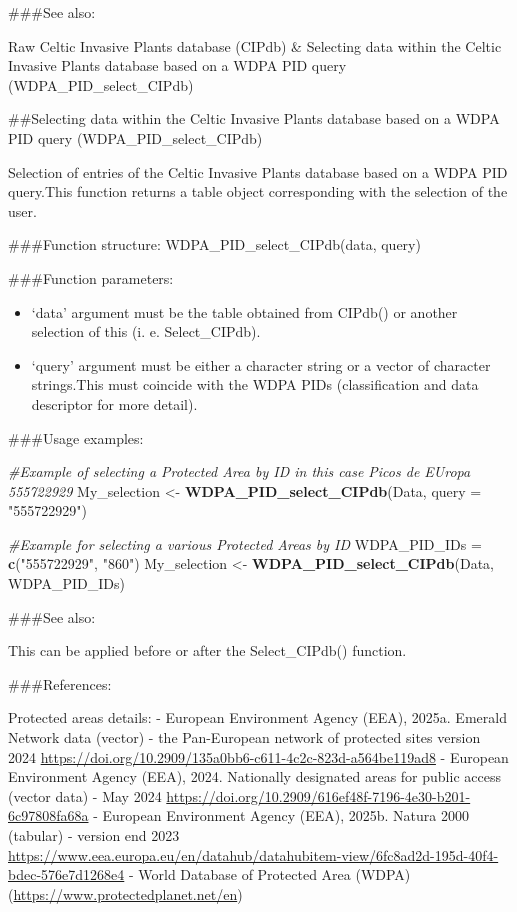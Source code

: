 \documentclass[
]{article}
\newenvironment{Shaded}{\begin{snugshade}}{\end{snugshade}}
\newcommand{\AttributeTok}[1]{\textcolor[rgb]{0.13,0.29,0.53}{#1}}
\newcommand{\CommentTok}[1]{\textcolor[rgb]{0.56,0.35,0.01}{\textit{#1}}}
\newcommand{\FunctionTok}[1]{\textcolor[rgb]{0.13,0.29,0.53}{\textbf{#1}}}
\newcommand{\NormalTok}[1]{#1}
\newcommand{\OtherTok}[1]{\textcolor[rgb]{0.56,0.35,0.01}{#1}}
\newcommand{\StringTok}[1]{\textcolor[rgb]{0.31,0.60,0.02}{#1}}
\providecommand{\tightlist}{%
  \setlength{\itemsep}{0pt}\setlength{\parskip}{0pt}}
\begin{document}
\#\#\#See also:

Raw Celtic Invasive Plants database (CIPdb) \& Selecting data within the
Celtic Invasive Plants database based on a WDPA PID query
(WDPA\_PID\_select\_CIPdb)

\#\#Selecting data within the Celtic Invasive Plants database based on a
WDPA PID query (WDPA\_PID\_select\_CIPdb)

Selection of entries of the Celtic Invasive Plants database based on a
WDPA PID query.This function returns a table object corresponding with
the selection of the user.

\#\#\#Function structure: WDPA\_PID\_select\_CIPdb(data, query)

\#\#\#Function parameters:

\begin{itemize}
\tightlist
\item
  `data' argument must be the table obtained from CIPdb() or another
  selection of this (i. e. Select\_CIPdb).
\item
  `query' argument must be either a character string or a vector of
  character strings.This must coincide with the WDPA PIDs
  (classification and data descriptor for more detail).
\end{itemize}

\#\#\#Usage examples:

\begin{Shaded}
\begin{Highlighting}[]
\CommentTok{\#Example of selecting a Protected Area by ID in this case Picos de EUropa  555722929}
\NormalTok{My\_selection }\OtherTok{\textless{}{-}} \FunctionTok{WDPA\_PID\_select\_CIPdb}\NormalTok{(Data, }\AttributeTok{query =} \StringTok{"555722929"}\NormalTok{)}

\CommentTok{\#Example for selecting a various Protected Areas by ID}
\NormalTok{WDPA\_PID\_IDs }\OtherTok{=} \FunctionTok{c}\NormalTok{(}\StringTok{"555722929"}\NormalTok{, }\StringTok{"860"}\NormalTok{)}
\NormalTok{My\_selection }\OtherTok{\textless{}{-}} \FunctionTok{WDPA\_PID\_select\_CIPdb}\NormalTok{(Data, WDPA\_PID\_IDs)}
\end{Highlighting}
\end{Shaded}

\#\#\#See also:

This can be applied before or after the Select\_CIPdb() function.

\#\#\#References:

Protected areas details: - European Environment Agency (EEA), 2025a.
Emerald Network data (vector) - the Pan-European network of protected
sites version 2024
\url{https://doi.org/10.2909/135a0bb6-c611-4c2c-823d-a564be119ad8} -
European Environment Agency (EEA), 2024. Nationally designated areas for
public access (vector data) - May 2024
\url{https://doi.org/10.2909/616ef48f-7196-4e30-b201-6c97808fa68a} -
European Environment Agency (EEA), 2025b. Natura 2000 (tabular) -
version end 2023
\url{https://www.eea.europa.eu/en/datahub/datahubitem-view/6fc8ad2d-195d-40f4-bdec-576e7d1268e4}
- World Database of Protected Area (WDPA)
(\url{https://www.protectedplanet.net/en})
\end{document}

